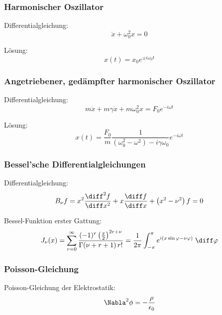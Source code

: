 \documentclass[11pt]{article}
\numberwithin{equation}{section}
\begin{document}
      \subsubsection{Harmonischer Oszillator}
        Differentialgleichung:
        \begin{equation}
          \ddot{x}+\omega_0^2 x = 0
        \end{equation}

        Lösung:
        \begin{equation}
          x(t)=x_0 e^{\pm i\omega_0 t}
        \end{equation}

      \subsubsection{Angetriebener, gedämpfter harmonischer Oszillator}
        Differentialgleichung:
        \begin{equation}
          m\ddot{x}+m\gamma\dot{x}+m\omega_0^2 x = F_0 e^{-i\omega t}
        \end{equation}

        Lösung:
        \begin{equation}
          x(t) = \frac{F_0}{m} \frac{1}{\left(\omega_0^2-\omega^2\right)-i\gamma\omega_0} e^{-i\omega t}
        \end{equation}

      \subsubsection{Bessel'sche Differentialgleichungen}
        Differentialgleichung:
        \begin{equation}
          B_\nu f = x^2\frac{\diff^2 f}{\diff x^2} + x\tder{f}{x}+\left(x^2-\nu^2\right)f = 0
        \end{equation}

        Bessel-Funktion erster Gattung:
        \begin{equation}
          J_\nu(x) = \sum_{r=0}^\infty \frac{(-1)^r\left(\frac{x}{2}\right)^{2r+\nu}}{\Gamma(\nu+r+1)\,r!} = \frac{1}{2\pi}\int_{-\pi}^{\pi} e^{i(x\sin\varphi-\nu\varphi)}\;\diff\varphi
        \end{equation}

      \subsubsection{Poisson-Gleichung}
        Poisson-Gleichung der Elektrostatik:
        \begin{equation}
          \Nabla^2\phi = -\frac{\rho}{\epsilon_0}
        \end{equation}
\end{document}
